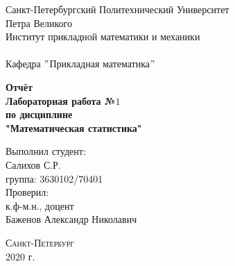 \documentclass[a4]{article}
\begin{document}
	\def\contentsname{\LARGE{Содержание}}
	\thispagestyle{empty}
	\begin{center} 
		\vspace{2cm} 
		{\Large \sc Санкт-Петербургский Политехнический Университет}\\
		\vspace{2mm}
		{\Large\sc Петра Великого}\\
		\vspace{1cm}
		{\large \sc Институт прикладной математики и механики\\ 
			\vspace{0.5mm}
			\textsc{}}\\ 
		\vspace{0.5mm}
		{\large\sc Кафедра $"$Прикладная математика$"$}\\
		\vspace{15mm}
		
		
		{\sc \textbf{Отчёт\\
			Лабораторная работа №$1$\\
			по дисциплине\\
			"Математическая статистика"}
			\vspace{6mm}
			
		}
		\vspace*{2mm}
		
		
		\begin{flushleft}
			\vspace{4cm}
			\sc Выполнил студент:\\
			\sc Салихов С.Р.\\
			\sc группа: 3630102/70401\\
			\vspace{1cm}
			\sc Проверил:\\
			\sc к.ф-м.н., доцент\\
			\sc Баженов Александр Николавич
			\vspace{20mm}
		\end{flushleft}
	\end{center} 
	\begin{center}
		\vfill {\large\textsc{Санкт-Петербург}}\\ 
		2020 г.
	\end{center}
	
	\newpage
	\pagestyle{plain}
	
	
	
\end{document}
